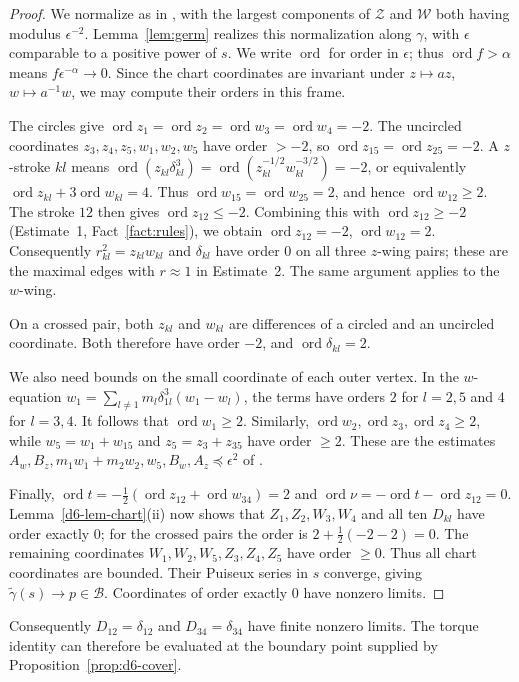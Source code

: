 \documentclass[Threeside,11pt]{article}
\theoremstyle{definition}
\theoremstyle{remark}
\numberwithin{equation}{section}
\theoremstyle{remark}
\newcommand{\ord}{\operatorname{ord}}
\begin{document}
\begin{proof}
{
We normalize as in \cite[p.~547]{AK}, with the largest components of
$\mathcal Z$ and $\mathcal W$ both having modulus $\epsilon^{-2}$.
Lemma~\ref{lem:germ} realizes this normalization along $\gamma$, with
$\epsilon$ comparable to a positive power of $s$.  We write $\ord$ for order
in $\epsilon$; thus $\ord f>\alpha$ means $f\epsilon^{-\alpha}\to0$.
Since the chart coordinates are invariant under $z\mapsto az$, $w\mapsto a^{-1}w$,
we may compute their orders in this frame.
}

{
The circles give $\ord z_1=\ord z_2=\ord w_3=\ord w_4=-2$.
The uncircled coordinates $z_3,z_4,z_5,w_1,w_2,w_5$ have order $>-2$,
so $\ord z_{15}=\ord z_{25}=-2$.  A $z$-stroke $kl$ means
$\ord(z_{kl}\delta_{kl}^3)=\ord(z_{kl}^{-1/2}w_{kl}^{-3/2})=-2$, or equivalently
$\ord z_{kl}+3\ord w_{kl}=4$.  Thus $\ord w_{15}=\ord w_{25}=2$, and hence
$\ord w_{12}\ge2$.  The stroke $12$ then gives $\ord z_{12}\le-2$.
Combining this with $\ord z_{12}\ge-2$ (Estimate~1, Fact~\ref{fact:rules}),
we obtain $\ord z_{12}=-2$, $\ord w_{12}=2$.
Consequently $r_{kl}^2=z_{kl}w_{kl}$ and $\delta_{kl}$ have order $0$ on
all three $z$-wing pairs; these are the maximal edges with $r\approx1$ in
Estimate~2.  The same argument applies to the $w$-wing.

On a crossed pair, both $z_{kl}$ and $w_{kl}$ are differences of a circled
and an uncircled coordinate.  Both therefore have order $-2$, and
$\ord\delta_{kl}=2$.

We also need bounds on the small coordinate of each outer vertex.
In the $w$-equation $w_1=\sum_{l\ne1}m_l\delta_{1l}^3(w_1-w_l)$,
the terms have orders $2$ for $l=2,5$ and $4$ for $l=3,4$.
It follows that $\ord w_1\ge2$.  Similarly,
$\ord w_2,\ord z_3,\ord z_4\ge2$, while
$w_5=w_1+w_{15}$ and $z_5=z_3+z_{35}$ have order $\ge2$.
These are the estimates $A_w,B_z,m_1w_1+m_2w_2,w_5,B_w,A_z\preccurlyeq\epsilon^2$
of \cite[\S8.6]{AK}.

Finally, $\ord t=-\frac12(\ord z_{12}+\ord w_{34})=2$ and
$\ord\nu=-\ord t-\ord z_{12}=0$.
Lemma~\ref{d6-lem-chart}(ii) now shows that $Z_1,Z_2,W_3,W_4$ and all ten
$D_{kl}$ have order exactly $0$; for the crossed pairs the order is
$2+\frac12(-2-2)=0$.  The remaining coordinates
$W_1,W_2,W_5,Z_3,Z_4,Z_5$ have order $\ge0$.
Thus all chart coordinates are bounded.  Their Puiseux series in $s$
converge, giving $\tilde\gamma(s)\to p\in\mathcal B$.
Coordinates of order exactly $0$ have nonzero limits.
}
\end{proof}
Consequently $D_{12}=\delta_{12}$ and $D_{34}=\delta_{34}$ have finite
nonzero limits. The torque identity can therefore be evaluated at the
boundary point supplied by Proposition~\ref{prop:d6-cover}.
\end{document}
